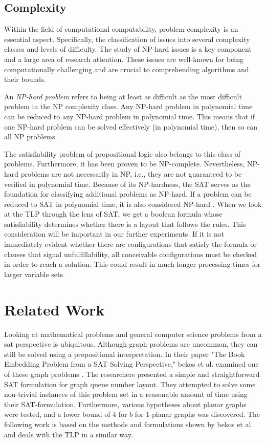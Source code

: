 \documentclass[bachelor, english]{algothesis}
\begin{document}
\subsection{Complexity}
Within the field of computational computability, problem complexity is an essential aspect. Specifically, the classification of issues into several complexity classes and levels of difficulty. The study of NP-hard issues is a key component and a large area of research attention. These issues are well-known for being computationally challenging and are crucial to comprehending algorithms and their bounds.

\begin{definition}
    An \emph{NP-hard problem} refers to being at least as difficult as the most difficult problem in the NP complexity class. Any NP-hard problem in polynomial time can be reduced to any NP-hard problem in polynomial time. This means that if one NP-hard problem can be solved effectively (in polynomial time), then so can all NP problems.
\end{definition}
\noindent
The satisfiability problem of propositional logic also belongs to this class of problems. Furthermore, it has been proven to be NP-complete. Nevertheless, NP-hard problems are not necessarily in NP, i.e., they are not guaranteed to be verified in polynomial time. Because of its NP-hardness, the SAT serves as the foundation for classifying additional problems as NP-hard. If a problem can be reduced to SAT in polynomial time, it is also considered NP-hard \cite{SAT_Complexity}. When we look at the TLP through the lens of SAT, we get a boolean formula whose satisfiability determines whether there is a layout that follows the rules. This consideration will be important in our further experiments. If it is not immediately evident whether there are configurations that satisfy the formula or clauses that signal unfulfillability, all conceivable configurations must be checked in order to reach a solution. This could result in much longer processing times for larger variable sets.

\section{Related Work}
Looking at mathematical problems and general computer science problems from a sat perspective is ubiquitous. Although graph problems are uncommon, they can still be solved using a propositional interpretation. In their paper "The Book Embedding Problem from a SAT-Solving Perspective," bekos et al. examined one of these graph problems \cite{book_embedding_sat}. The researchers presented a simple and straightforward SAT formulation for graph queue number layout. They attempted to solve some non-trivial instances of this problem set in a reasonable amount of time using their SAT-formulation. Furthermore, various hypotheses about planar graphs were tested, and a lower bound of 4 for $b$ for 1-planar graphs was discovered. The following work is based on the methods and formulations shown by bekos et al. and deals with the TLP in a similar way.
\end{document}
